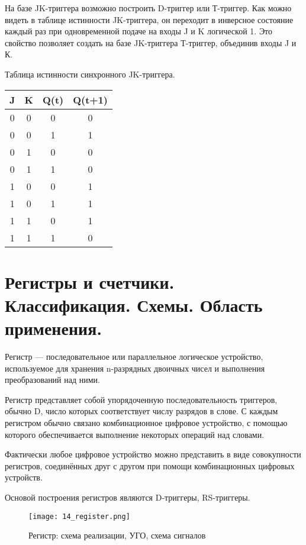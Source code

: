 На базе JK-триггера возможно построить D-триггер или Т-триггер. Как можно видеть в таблице истинности JK-триггера, он переходит в инверсное состояние каждый раз при одновременной подаче на входы J и K логической 1. Это свойство позволяет создать на базе JK-триггера Т-триггер, объединив входы J и К.

Таблица истинности синхронного JK-триггера.

\begin{tabular}{|c|c|c|c|}
\hline	J	& K	& Q(t)	& Q(t+1)	\\
\hline	0	& 0	& 0		& 0			\\
\hline	0	& 0	& 1		& 1			\\
\hline	0	& 1	& 0		& 0			\\
\hline	0	& 1	& 1		& 0			\\
\hline	1	& 0	& 0		& 1			\\
\hline	1	& 0	& 1		& 1			\\
\hline	1	& 1	& 0		& 1			\\
\hline	1	& 1	& 1		& 0			\\
\hline
\end{tabular}


\section{Регистры и счетчики. Классификация. Схемы. Область применения.}

Регистр --- последовательное или параллельное логическое устройство, используемое для хранения n-разрядных двоичных чисел и выполнения преобразований над ними.

Регистр представляет собой упорядоченную последовательность триггеров, обычно D, число которых соответствует числу разрядов в слове. С каждым регистром обычно связано комбинационное цифровое устройство, с помощью которого обеспечивается выполнение некоторых операций над словами.

Фактически любое цифровое устройство можно представить в виде совокупности регистров, соединённых друг с другом при помощи комбинационных цифровых устройств.

Основой построения регистров являются D-триггеры, RS-триггеры.

\begin{figure}[H]
\centering
\texttt{[image: 14\_register.png]}
\caption{Регистр: схема реализации, УГО, схема сигналов}
\label{fig:14_register}
\end{figure}

